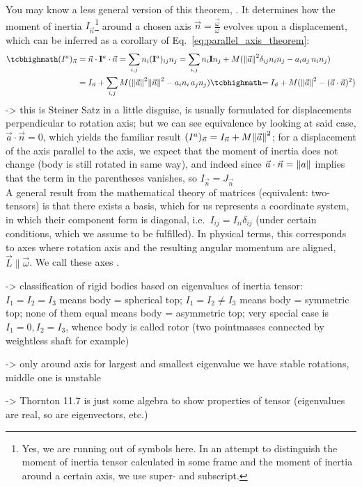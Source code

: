 \documentclass[../class_mech_main.tex]{subfiles}
\begin{document}
You may know a less general version of this theorem, . It determines how the moment of inertia $I_{\vec{n}}$\footnote{Yes, we are running out of symbols here. In an attempt to distinguish the moment of inertia tensor calculated in some frame and the moment of inertia around a certain axis, we use super- and subscript.} around a chosen axis $\vec{n} = \frac{\vec{\omega}}{\omega}$ evolves upon a displacement, which can be inferred as a corollary of Eq.~\eqref{eq:parallel_axis_theorem}:
\begin{equation}\label{eq:steiner_theorem}
	\begin{split}
		\eqbox{
			(I^a)_{\vec{n}}
		}
		&= \vec{n} \cdot \tensor{I}^a \cdot \vec{n}
		= \sum_{i, j} n_i (\tensor{I}^a)_{ij} n_j
		= \sum_{i, j} n_i \tensor{I} n_j + M (\norm{\vec{a}}^2 \delta_{ij} n_i n_j - a_i a_j \, n_i n_j)
		\\
		&= I_{\vec{n}} + \sum_{i, j} M (\norm{\vec{a}}^2 \norm{\vec{n}}^2 - a_i n_i \, a_j n_j)
		\eqbox{
			= I_{\vec{n}} + M (\norm{\vec{a}}^2 - (\vec{a} \cdot \vec{n})^2)
		}
	\end{split}
\end{equation}
-> this is Steiner Satz in a little disguise, is usually formulated for displacements perpendicular to rotation axis; but we can see equivalence by looking at said case, $\vec{a} \cdot \vec{n} = 0$, which yields the familiar result $(I^a)_{\vec{n}} = I_{\vec{n}} + M \norm{\vec{a}}^2$; for a displacement of the axis parallel to the axis, we expect that the moment of inertia does not change (body is still rotated in same way), and indeed since $\vec{a} \cdot \vec{n} = \norm{a}$ implies that the term in the parentheses vanishes, so $I_{\vec{n}} = J_{\vec{n}}$\\


A general result from the mathematical theory of matrices (equivalent: two-tensors) is that there exists a basis, which for us represents a coordinate system, in which their component form is diagonal, i.e.~$I_{ij} = I_{ii} \delta_{ij}$ (under certain conditions, which we assume to be fulfilled). In physical terms, this corresponds to axes where rotation axis and the resulting angular momentum are aligned, $\vec{L} \parallel \vec{\omega}$. We call these axes .


-> classification of rigid bodies based on eigenvalues of inertia tensor: $I_1 = I_2 = I_3$ means body = spherical top; $I_1 = I_2 \neq I_3$ means body = symmetric top; none of them equal means body = asymmetric top; very special case is $I_1 = 0, I_2 = I_3$, whence body is called rotor (two pointmasses connected by weightless shaft for example)

-> only around axis for largest and smallest eigenvalue we have stable rotations, middle one is unstable


-> Thornton 11.7 is just some algebra to show properties of tensor (eigenvalues are real, so are eigenvectors, etc.)
\end{document}
